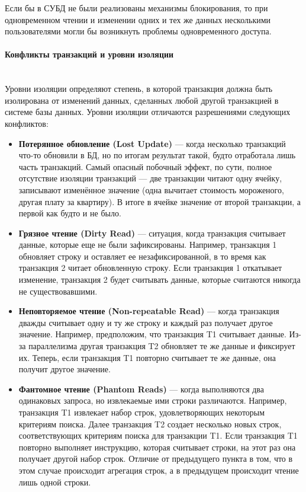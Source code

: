 Если бы в СУБД не были реализованы механизмы блокирования, то при одновременном чтении и изменении одних и тех же данных несколькими пользователями могли бы возникнуть проблемы одновременного доступа.


\paragraph{Конфликты транзакций и уровни изоляции} ~\\

Уровни изоляции определяют степень, в которой транзакция должна быть изолирована от изменений данных, сделанных любой другой транзакцией в системе базы данных. Уровни изоляции отличаются разрешениями следующих конфликтов:

\begin{itemize}
    \item 
        \textbf{Потерянное обновление (Lost Update)} — когда несколько транзакций что-то обновили в БД, но по итогам результат такой, будто отработала лишь часть транзакций. Самый опасный побочный эффект, по сути, полное отсутствие изоляции транзакций — две транзакции читают одну ячейку, записывают изменённое значение (одна вычитает стоимость мороженого, другая плату за квартиру). В итоге в ячейке значение от второй транзакции, а первой как будто и не было.
    \item 
        \textbf{Грязное чтение (Dirty Read)} — ситуация, когда транзакция считывает данные, которые еще не были зафиксированы. Например, транзакция 1 обновляет строку и оставляет ее незафиксированной, в то время как транзакция 2 читает обновленную строку. Если транзакция 1 откатывает изменение, транзакция 2 будет считывать данные, которые считаются никогда не существовавшими.
    \item 
        \textbf{Неповторяемое чтение (Non-repeatable Read)} — когда транзакция дважды считывает одну и ту же строку и каждый раз получает другое значение. Например, предположим, что транзакция T1 считывает данные. Из-за параллелизма другая транзакция T2 обновляет те же данные и фиксирует их. Теперь, если транзакция T1 повторно считывает те же данные, она получит другое значение.
    \item 
        \textbf{Фантомное чтение (Phantom Reads)} — когда выполняются два одинаковых запроса, но извлекаемые ими строки различаются. Например, транзакция T1 извлекает набор строк, удовлетворяющих некоторым критериям поиска. Далее транзакция T2 создает несколько новых строк, соответствующих критериям поиска для транзакции T1. Если транзакция T1 повторно выполняет инструкцию, которая считывает строки, на этот раз она получает другой набор строк. Отличие от предыдущего пункта в том, что в этом случае происходит агрегация строк, а в предыдущем происходит чтение лишь одной строки.
\end{itemize}

